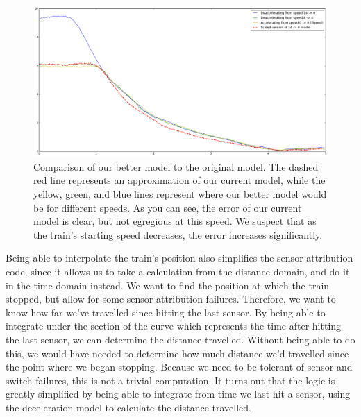 \documentclass{article}
\begin{document}
\begin{figure}
\caption{Comparison of our better model to the original model. The dashed red
line represents an approximation of our current model, while the yellow, green,
and blue lines represent where our better model would be for different speeds.
As you can see, the error of our current model is clear, but not egregious at
this speed. We suspect that as the train's starting speed decreases,
the error increases significantly.}
\label{fig:better-deceleration}
\includegraphics[width=\linewidth]{better-deceleration.png}
\end{figure}

Being able to interpolate the train's position
also simplifies the sensor attribution code, since it allows
us to take a calculation from the distance domain, and do it in
the time domain instead.
We want to find the position at which the train stopped, but allow
for some sensor attribution failures.
Therefore, we want to know how far we've travelled since hitting the last sensor.
By being able to integrate under the section of the curve which represents
the time after hitting the last sensor, we can determine the distance travelled.
Without being able to do this, we would have needed to determine how much distance we'd
travelled since the point where we began stopping.
Because we need to be tolerant of sensor and switch failures, this is not a trivial computation.
It turns out that the logic is greatly simplified by being able to integrate from time
we last hit a sensor, using the deceleration model to calculate the distance travelled.
\end{document}
